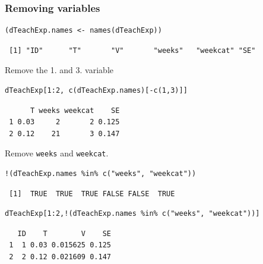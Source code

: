 \documentclass[bigger]{beamer}
\begin{document}
\begin{frame}[fragile,shrink = 15]
\frametitle{Removing variables}
\label{sec-4-1-8}


\lstset{language=R}
\begin{lstlisting}
(dTeachExp.names <- names(dTeachExp))
\end{lstlisting}

\begin{verbatim}
 [1] "ID"      "T"       "V"       "weeks"   "weekcat" "SE"
\end{verbatim}

    Remove the 1. and 3. variable

\lstset{language=R}
\begin{lstlisting}
dTeachExp[1:2, c(dTeachExp.names)[-c(1,3)]]
\end{lstlisting}

\begin{verbatim}
      T weeks weekcat    SE
 1 0.03     2       2 0.125
 2 0.12    21       3 0.147
\end{verbatim}

     Remove \texttt{weeks} and \texttt{weekcat}.

\lstset{language=R}
\begin{lstlisting}
!(dTeachExp.names %in% c("weeks", "weekcat"))
\end{lstlisting}

\begin{verbatim}
 [1]  TRUE  TRUE  TRUE FALSE FALSE  TRUE
\end{verbatim}


\lstset{language=R}
\begin{lstlisting}
dTeachExp[1:2,!(dTeachExp.names %in% c("weeks", "weekcat"))]
\end{lstlisting}

\begin{verbatim}
   ID    T        V    SE
 1  1 0.03 0.015625 0.125
 2  2 0.12 0.021609 0.147
\end{verbatim}

\end{frame}
\end{document}

